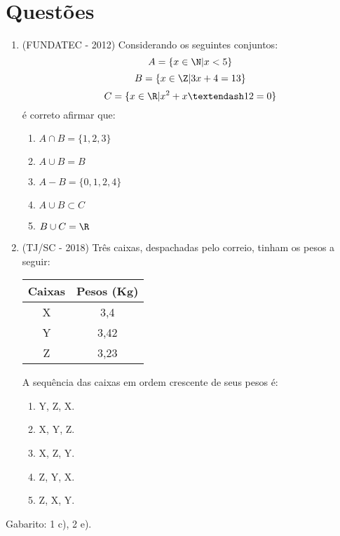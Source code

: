 \section{Questões}
  
  \begin{enumerate}
   \item (FUNDATEC - 2012)  Considerando os seguintes conjuntos:
         \[ A = \{x \in \N | x < 5\}\]
         \[ B = \{x \in \Z | 3x + 4 = 13\}\]
         \[ C = \{x \in \R | x^2 + x – 12 = 0 \} \]
   é correto afirmar que: 
   \begin{enumerate}
   \item $A \cap B = \{ 1,2,3\}$
   \item $A \cup B = B$
   \item $A - B = \{0,1,2,4\}$
   \item $A \cup B \subset C$
   \item $B \cup C= \R$
  \end{enumerate}
  
 \item (TJ/SC - 2018) Três caixas, despachadas pelo correio, tinham os pesos a seguir:
 \begin{table}[H]
 \centering
 \begin{tabular}{|c|c|} \hline
 \rowcolor{cinza}
 Caixas & Pesos (Kg) \\ \hline
 X & 3,4 \\ \hline
 Y & 3,42 \\ \hline
 Z & 3,23 \\ \hline
 \end{tabular}
 \end{table}
 A sequência das caixas em ordem crescente de seus pesos é:
  \begin{enumerate}
  \item Y, Z, X.
  \item X, Y, Z.
  \item X, Z, Y.
  \item Z, Y, X.
  \item Z, X, Y.
 \end{enumerate}
  
  \end{enumerate}

  Gabarito: 1 c), 2 e).
